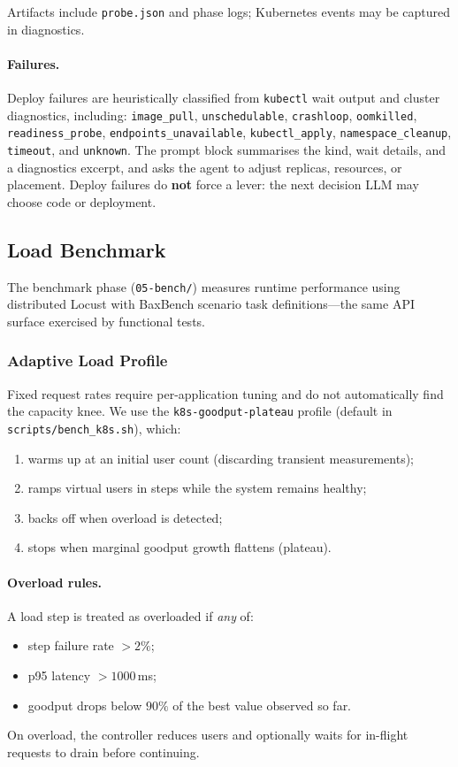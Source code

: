 Artifacts include \texttt{probe.json} and phase logs; Kubernetes events may be
captured in diagnostics.

\paragraph{Failures.}
Deploy failures are heuristically classified from \texttt{kubectl} wait
output and cluster diagnostics, including:
\texttt{image\_pull}, \texttt{unschedulable}, \texttt{crashloop},
\texttt{oomkilled}, \texttt{readiness\_probe}, \texttt{endpoints\_unavailable},
\texttt{kubectl\_apply}, \texttt{namespace\_cleanup}, \texttt{timeout}, and
\texttt{unknown}.  The prompt block summarises the kind, wait details, and a
diagnostics excerpt, and asks the agent to adjust replicas, resources, or
placement.  Deploy failures do \textbf{not} force a lever: the next decision
LLM may choose code or deployment.


\subsection{Load Benchmark}
\label{sec:methods-bench}

The benchmark phase (\texttt{05-bench/}) measures runtime performance using
distributed Locust with BaxBench scenario task definitions---the same API
surface exercised by functional tests.

\subsubsection{Adaptive Load Profile}

Fixed request rates require per-application tuning and do not automatically
find the capacity knee.  We use the \texttt{k8s-goodput-plateau} profile
(default in \texttt{scripts/bench\_k8s.sh}), which:
\begin{enumerate}
  \item warms up at an initial user count (discarding transient measurements);
  \item ramps virtual users in steps while the system remains healthy;
  \item backs off when overload is detected;
  \item stops when marginal goodput growth flattens (plateau).
\end{enumerate}

\paragraph{Overload rules.}
A load step is treated as overloaded if \emph{any} of:
\begin{itemize}
  \item step failure rate $> 2\%$;
  \item p95 latency $> 1000$\,ms;
  \item goodput drops below $90\%$ of the best value observed so far.
\end{itemize}
On overload, the controller reduces users and optionally waits for in-flight
requests to drain before continuing.

